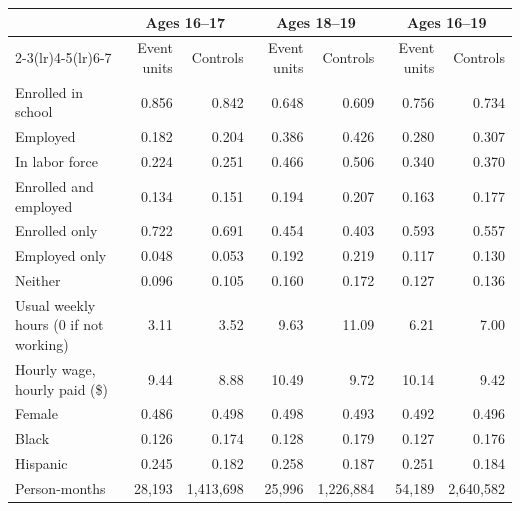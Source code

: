 \begin{tabular}{lrrrrrr}
\toprule
 & \multicolumn{2}{c}{Ages 16--17} & \multicolumn{2}{c}{Ages 18--19} & \multicolumn{2}{c}{Ages 16--19} \\
\cmidrule(lr){2-3}\cmidrule(lr){4-5}\cmidrule(lr){6-7}
 & Event units & Controls & Event units & Controls & Event units & Controls \\
\midrule
Enrolled in school & 0.856 & 0.842 & 0.648 & 0.609 & 0.756 & 0.734 \\
Employed & 0.182 & 0.204 & 0.386 & 0.426 & 0.280 & 0.307 \\
In labor force & 0.224 & 0.251 & 0.466 & 0.506 & 0.340 & 0.370 \\
Enrolled and employed & 0.134 & 0.151 & 0.194 & 0.207 & 0.163 & 0.177 \\
Enrolled only & 0.722 & 0.691 & 0.454 & 0.403 & 0.593 & 0.557 \\
Employed only & 0.048 & 0.053 & 0.192 & 0.219 & 0.117 & 0.130 \\
Neither & 0.096 & 0.105 & 0.160 & 0.172 & 0.127 & 0.136 \\
Usual weekly hours (0 if not working) & 3.11 & 3.52 & 9.63 & 11.09 & 6.21 & 7.00 \\
Hourly wage, hourly paid (\$) & 9.44 & 8.88 & 10.49 & 9.72 & 10.14 & 9.42 \\
Female & 0.486 & 0.498 & 0.498 & 0.493 & 0.492 & 0.496 \\
Black & 0.126 & 0.174 & 0.128 & 0.179 & 0.127 & 0.176 \\
Hispanic & 0.245 & 0.182 & 0.258 & 0.187 & 0.251 & 0.184 \\
Person-months & 28,193 & 1,413,698 & 25,996 & 1,226,884 & 54,189 & 2,640,582 \\
\bottomrule
\end{tabular}
